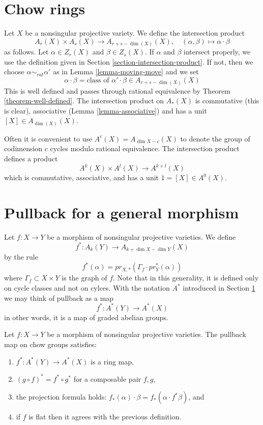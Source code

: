 \section{Chow rings}
\label{section-chow-rings}

\noindent
Let $X$ be a nonsingular projective variety. We define the intersection
product
$$
A_r(X) \times A_s(X) \longrightarrow A_{r + s - \dim(X)}(X),\quad
(\alpha, \beta) \longmapsto \alpha \cdot \beta
$$
as follows. Let $\alpha \in Z_r(X)$ and $\beta \in Z_s(X)$.
If $\alpha$ and $\beta$ intersect properly, we use the
definition given in Section \ref{section-intersection-product}.
If not, then we choose $\alpha \sim_{rat} \alpha'$ as in
Lemma \ref{lemma-moving-move} and we set
$$
\alpha \cdot \beta =
\text{class of }\alpha' \cdot \beta \in A_{r + s - \dim(X)}(X)
$$
This is well defined and passes through rational equivalence by
Theorem \ref{theorem-well-defined}. The intersection product
on $A_*(X)$ is commutative (this is clear), associative
(Lemma \ref{lemma-associative}) and has a unit $[X] \in A_{\dim(X)}(X)$.

\medskip\noindent
Often it is convenient to use $A^c(X) = A_{\dim X - c}(X)$ to denote the
group of codimension $c$ cycles modulo rational equivalence.
The intersection product defines a product
$$
A^k(X) \times A^l(X) \longrightarrow A^{k+l}(X)
$$
which is commutative, associative, and has a unit $1 = [X] \in A^0(X)$.


\section{Pullback for a general morphism}
\label{section-general-pullback}

\noindent
Let $f : X \to Y$ be a morphism of nonsingular projective varieties.
We define
$$
f^* : A_k(Y) \to A_{k+\dim X - \dim Y}(X)
$$
by the rule
$$
f^*(\alpha) = pr_{X, *}(\Gamma_f \cdot pr_Y^*(\alpha))
$$
where $\Gamma_f \subset X\times Y$ is the graph of $f$. Note that in this
generality, it is defined only on cycle classes and not on cylces. With the
notation $A^*$ introduced in Section \ref{section-chow-rings}
we may think of pullback as a map
$$
f^* : A^*(Y) \to A^*(X)
$$
in other words, it is a map of graded abelian groups.

\begin{lemma}
\label{lemma-pullback-and-intersection-product}
Let $f : X \to Y$ be a morphism of nonsingular projective varieties.
The pullback map on chow groups satisfies:
\begin{enumerate}
\item $f^* : A^*(Y) \to A^*(X)$ is a ring map,
\item $(g \circ f)^* = f^* \circ g^*$ for a composable pair $f, g$,
\item the projection formula holds: $f_*(\alpha) \cdot \beta =
f_*( \alpha \cdot f^*\beta)$, and
\item if $f$ is flat then it agrees with the previous definition.
\end{enumerate}
\end{lemma}

